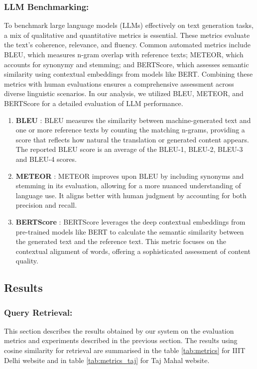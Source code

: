 \documentclass[sigconf,natbib=true,anonymous=false]{acmart}
\begin{document}
\subsubsection{\textbf{LLM Benchmarking:}}
To benchmark large language models (LLMs) effectively on text generation tasks, a mix of qualitative and quantitative metrics is essential. These metrics evaluate the text's coherence, relevance, and fluency. Common automated metrics include BLEU, which measures n-gram overlap with reference texts; METEOR, which accounts for synonymy and stemming; and BERTScore, which assesses semantic similarity using contextual embeddings from models like BERT. Combining these metrics with human evaluations ensures a comprehensive assessment across diverse linguistic scenarios. In our analysis, we utilized BLEU, METEOR, and BERTScore for a detailed evaluation of LLM performance.
\begin{enumerate}
    \item \textbf{BLEU} \cite{papineni2002bleu}: BLEU measures the similarity between machine-generated text and one or more reference texts by counting the matching n-grams, providing a score that reflects how natural the translation or generated content appears. The reported BLEU score is an average of the BLEU-1, BLEU-2, BLEU-3 and BLEU-4 scores.
    \item \textbf{METEOR} \cite{banerjee2005meteor}: METEOR improves upon BLEU by including synonyms and stemming in its evaluation, allowing for a more nuanced understanding of language use. It aligns better with human judgment by accounting for both precision and recall.
    \item \textbf{BERTScore} \cite{zhang2019bertscore}: BERTScore leverages the deep contextual embeddings from pre-trained models like BERT to calculate the semantic similarity between the generated text and the reference text. This metric focuses on the contextual alignment of words, offering a sophisticated assessment of content quality.

\end{enumerate}

\subsection{Results}
\subsubsection{\textbf{Query Retrieval: }}
This section describes the results obtained by our system on the evaluation metrics and experiments described in the previous section. The results using cosine similarity for retrieval are summarised in the table \ref{tab:metrics} for IIIT Delhi website and in table \ref{tab:metrics_taj} for Taj Mahal website. 
\end{document}
